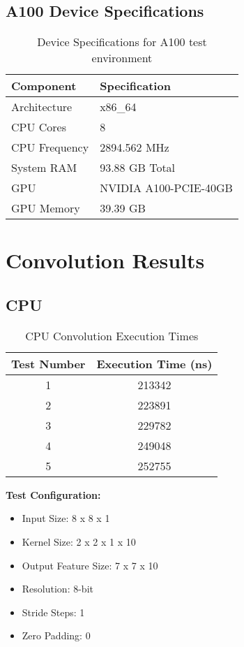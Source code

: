 \subsection{A100 Device Specifications}
\begin{table}[h]
    \centering
    \begin{tabular}{|l|l|}
        \hline
        \textbf{Component} & \textbf{Specification} \\
        \hline
        Architecture & x86\_64 \\
        CPU Cores & 8 \\
        CPU Frequency & 2894.562 MHz \\
        System RAM & 93.88 GB Total \\
        GPU & NVIDIA A100-PCIE-40GB \\
        GPU Memory & 39.39 GB \\
        \hline
    \end{tabular}
    \caption{Device Specifications for A100 test environment}
    \label{tab:a100_specs}
\end{table}


\section{Convolution Results}

\subsection{CPU}
\begin{table}[h]
    \centering
    \begin{tabular}{|c|c|}
        \hline
        \textbf{Test Number} & \textbf{Execution Time (ns)} \\
        \hline
        1 & 213342 \\
        2 & 223891 \\
        3 & 229782 \\
        4 & 249048 \\
        5 & 252755 \\
        \hline
    \end{tabular}
    \caption{CPU Convolution Execution Times}
    \label{tab:cpu_conv_times}
\end{table}

\textbf{Test Configuration:}
\begin{itemize}
    \item Input Size: 8 x 8 x 1
    \item Kernel Size: 2 x 2 x 1 x 10
    \item Output Feature Size: 7 x 7 x 10
    \item Resolution: 8-bit
    \item Stride Steps: 1
    \item Zero Padding: 0
\end{itemize}

